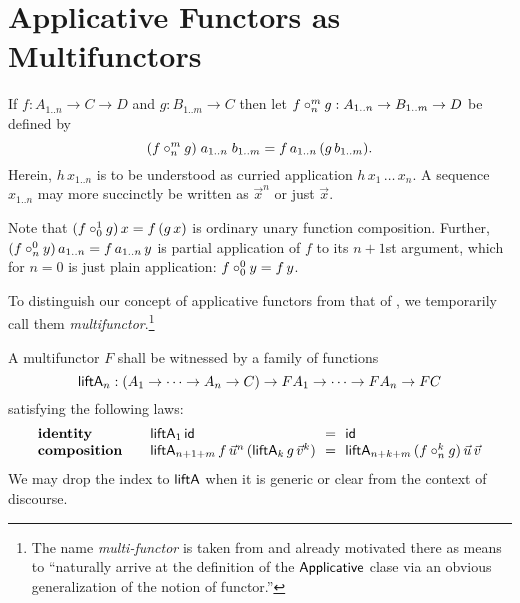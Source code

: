 {\section{Applicative Functors as Multifunctors}

If $f : A_{1..n} \to C \to D$ and $g : B_{1..m} \to C$ then let
$f \compose[m]n g : A_{1..n} \to B_{1..m} \to D$ be
defined by
\[
  (f \compose[m]n g)\;a_{1..n}\;b_{1..m} = f\,a_{1..n}\,(g\,b_{1..m})
  .
\]
Herein, $h\,x_{1..n}$ is to be understood as curried application
$h\,x_1\,\dots\,x_n$.  A sequence $x_{1..n}$ may more succinctly be
written as $\vec x^n$ or just $\vec x$.

Note that $(f \compose[1]0 g)\,x = f\,(g\,x)$ is ordinary unary function composition.
Further, $(f \compose[0]n y)\,a_{1..n} = f\,a_{1..n}\,y$ is partial application of $f$ to its $n+1$st argument, which for $n=0$ is just plain application: $f \compose[0]0 y = f\,y$.

To distinguish our concept of applicative functors from that of
\citeauthor{mcBridePaterson:jfp08}, we temporarily call them
\emph{multifunctor}.\footnote{
  The name \emph{multi-functor} is taken from
  \citet{capriottiKaposi:msfp14} and already motivated there as means
  to ``naturally arrive at the definition of the $\tApplicative$ clase
  via an obvious generalization of the notion of functor.''
}

A multifunctor $F$ shall be witnessed by a family of functions
\[
  \liftA[n] :
    (A_1 \to \dots \to A_n \to C) \to FA_1 \to \dots \to FA_n \to FC
\]
satisfying the following laws:
\[
  \begin{array}{l@{\qquad}l@{~~}l@{~~}l}
\law{identity} & \liftA[1]\,\tid & = & \tid \\
\law{composition}
  & \liftA[n+1+m]\,f\,\vec u^n\,(\liftA[k]\,g\,\vec v^k)
  & =
  & \liftA[n+k+m]\,(f \compose[k]n g)\,\vec u\, \vec v
  \end{array}
\]
%
We may %
drop the index to $\tliftA$ when it is
generic or clear from the context of discourse.

}
